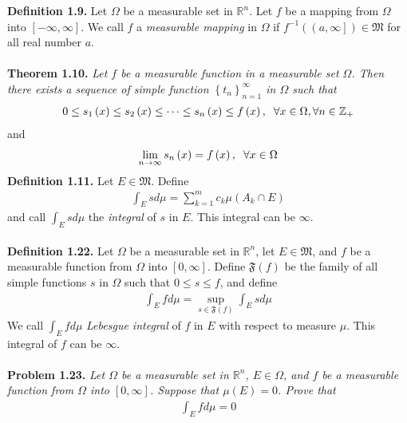 \documentclass[a4paper]{article}
\numberwithin{equation}{section}
\begin{document}
\textbf{Definition 1.9.} Let $\Omega$ be a measurable set in $\mathbb{R}^n$. Let $f$ be a mapping from $\Omega$ into $\left[-\infty,\infty\right]$. We call $f$ a \textit{measurable mapping} in $\Omega$ if ${f^{ - 1}}\left( {\left( {a,\infty } \right]} \right) \in \mathfrak{M}$ for all real number $a$.\\
\\
\textbf{Theorem 1.10.} \textit{Let $f$ be a measurable function in a measurable set $\Omega$. Then there exists a sequence of simple function $\left\{ {{t_n}} \right\}_{n = 1}^\infty $ in $\Omega$ such that}
\begin{align}
0 \le {s_1}\left( x \right) \le {s_2}\left( x \right) \le  \cdots  \le {s_n}\left( x \right) \le f\left( x \right),\hspace{0.2cm}\forall x \in \Omega ,\forall n \in {\mathbb{Z}_ + }
\end{align}
and
\begin{align}
\mathop {\lim }\limits_{n \to \infty } {s_n}\left( x \right) = f\left( x \right),\hspace{0.2cm}\forall x \in \Omega 
\end{align}
\textbf{Definition 1.11.} Let $E\in \mathfrak{M}$. Define
\begin{align}
\int_E {sd\mu }  = \sum\limits_{k = 1}^m {{c_k}\mu \left( {{A_k} \cap E} \right)} 
\end{align}
and call $\int_E {sd\mu } $ the \textit{integral} of $s$ in $E$. This integral can be $\infty$.\\
\\
\textbf{Definition 1.22.} Let $\Omega$ be a measurable set in $\mathbb{R}^n$, let $E\in \mathfrak{M}$, and $f$ be a measurable function from $\Omega$ into $\left[0,\infty\right]$. Define $\mathfrak{F}\left(f\right)$ be the family of all simple functions $s$ in $\Omega$ such that $0\le s\le f$, and define
\begin{align}
\int_E {fd\mu }  = \mathop {\sup }\limits_{s \in \mathfrak{F}\left( f \right)} \int_E {sd\mu } 
\end{align}
We call $\int_E {fd\mu } $ \textit{Lebesgue integral} of $f$ in $E$ with respect to measure $\mu$. This integral of $f$ can be $\infty$.\\
\\
\textbf{Problem 1.23.} \textit{Let $\Omega$ be a measurable set in $\mathbb{R}^n$, $E\in \Omega$, and $f$ be a measurable function from $\Omega$ into $\left[0,\infty\right]$. Suppose that $\mu\left(E\right)=0$. Prove that}
\begin{align}
\int_E {fd\mu }  = 0
\end{align}
\end{document}
